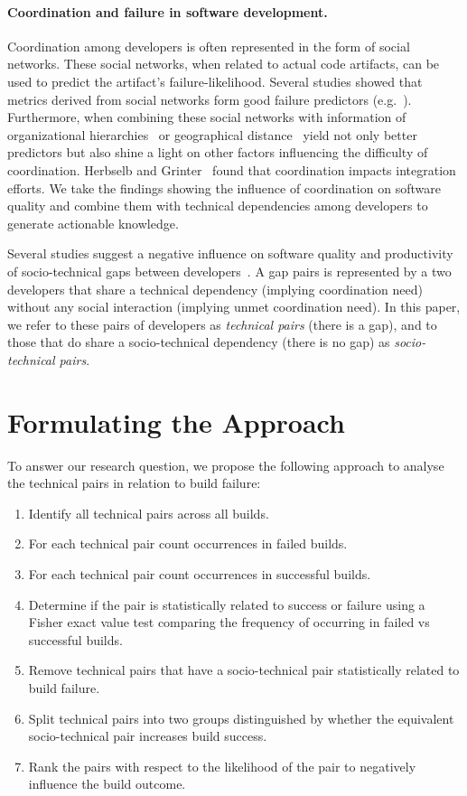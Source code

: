 \documentclass[conference]{IEEEtran}
\begin{document}
\paragraph{Coordination and failure in software development.}
Coordination among developers is often represented in the form of social networks.
These social networks, when related to actual code artifacts, can be used to predict the artifact's failure-likelihood.
Several studies showed that metrics derived from social networks form good failure predictors (e.g.~\cite{meneely:fse:2008}).
Furthermore, when combining these social networks with information of organizational hierarchies~\cite{nagappan:icse:2008} or geographical distance~\cite{bird:acm:2009} yield not only better predictors but also shine a light on other factors influencing the difficulty of coordination.
Herbselb and Grinter~\cite{herbsleb:icse:1999} found that coordination impacts integration efforts.
We take the findings showing the influence of coordination on software quality and combine them with technical dependencies among developers to generate actionable knowledge.

Several studies suggest a negative influence on software quality and productivity of socio-technical gaps between developers~\cite{valetto:msr:2007,kwan:tse:2011}.
A gap pairs is represented by a two developers that share a technical dependency (implying coordination need) without any social interaction (implying
unmet coordination need).
In this paper, we refer to these pairs of developers as \emph{technical pairs} (there is a gap), and to those that do
share a socio-technical dependency (there is no gap) as \emph{socio-technical pairs}.

\section{Formulating the Approach}
To answer our research question, we propose the following approach to analyse the technical pairs in relation to build failure:

\begin{enumerate}
\item Identify all technical pairs across all builds.
\item For each technical pair count occurrences in
failed builds.
\item For each technical pair count occurrences in
successful builds.
\item Determine if the pair is statistically related to success or failure using a Fisher exact value test comparing the frequency of occurring in failed vs successful builds.
\item Remove technical pairs that have a socio-technical pair statistically related to build failure.
\item Split technical pairs into two groups distinguished by whether the equivalent socio-technical pair increases build success.
\item Rank the pairs with respect to the likelihood of the pair to negatively influence the build outcome.
\end{enumerate}
\end{document}
